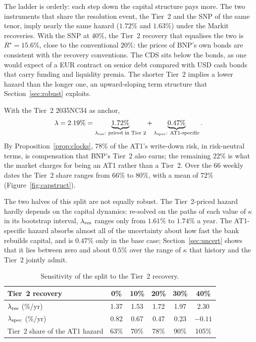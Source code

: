 The ladder is orderly: each step down the capital structure pays more. The two instruments
that share the resolution event, the Tier~2 and the SNP of the same tenor, imply nearly the
same hazard ($1.72\%$ and $1.63\%$) under the Markit recoveries. With the SNP at $40\%$, the
Tier~2 recovery that equalises the two is $R^\star=15.6\%$, close to the conventional $20\%$:
the prices of BNP's own bonds are consistent with the recovery conventions. The CDS sits
below the bonds, as one would expect of a EUR contract on senior debt compared with USD cash
bonds that carry funding and liquidity premia. The shorter Tier~2 implies a lower hazard than
the longer one, an upward-sloping term structure that Section~\ref{sec:robust} exploits.

With the Tier~2 2035NC34 as anchor,
\begin{equation}
  \lambda = 2.19\% = \underbrace{1.72\%}_{\lambda_{\mathrm{res}}:\ \text{priced in Tier~2}}
  + \underbrace{0.47\%}_{\lambda_{\mathrm{spec}}:\ \text{AT1-specific}} .
\end{equation}
By Proposition~\ref{prop:clocks}, $78\%$ of the AT1's write-down risk, in risk-neutral
terms, is compensation that BNP's Tier~2 also earns; the remaining $22\%$ is what the market
charges for being an AT1 rather than a Tier~2. Over the 66 weekly dates the Tier~2 share
ranges from $66\%$ to $80\%$, with a mean of $72\%$ (Figure~\ref{fig:capstruct}).

The two halves of this split are not equally robust. The Tier~2-priced hazard hardly depends
on the capital dynamics: re-solved on the paths of each value of $\kappa$ in its bootstrap
interval, $\lambda_{\mathrm{res}}$ ranges only from $1.61\%$ to $1.74\%$ a year. The AT1-specific hazard
absorbs almost all of the uncertainty about how fast the bank rebuilds capital, and is
$0.47\%$ only in the base case; Section~\ref{sec:uncert} shows that it lies between zero and
about $0.5\%$ over the range of $\kappa$ that history and the Tier~2 jointly admit.

\begin{table}[H]
\centering
\begin{tabular}{lccccc}
\toprule
Tier~2 recovery & 0\% & 10\% & 20\% & 30\% & 40\% \\
\midrule
$\lambda_{\mathrm{res}}$ (\%/yr) & 1.37 & 1.53 & 1.72 & 1.97 & 2.30 \\
$\lambda_{\mathrm{spec}}$ (\%/yr) & 0.82 & 0.67 & 0.47 & 0.23 & $-0.11$ \\
Tier~2 share of the AT1 hazard & 63\% & 70\% & 78\% & 90\% & 105\% \\
\bottomrule
\end{tabular}
\caption{Sensitivity of the split to the Tier~2 recovery.}
\label{tab:recovery}
\end{table}


